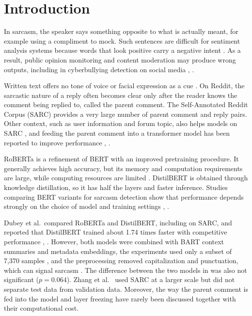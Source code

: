 \documentclass[conference]{IEEEtran}
\begin{document}
\section{Introduction}
In sarcasm, the speaker says something opposite to what is actually meant, for example using a compliment to mock. Such sentences are difficult for sentiment analysis systems because words that look positive carry a negative intent \cite{prakash2025sarcasm}. As a result, public opinion monitoring and content moderation may produce wrong outputs, including in cyberbullying detection on social media \cite{dhumpati2025sarcasm}, \cite{grover2026emoji}.

Written text offers no tone of voice or facial expression as a cue \cite{jimenez2026bert}. On Reddit, the sarcastic nature of a reply often becomes clear only after the reader knows the comment being replied to, called the parent comment. The Self-Annotated Reddit Corpus (SARC) \cite{khodak2018sarc} provides a very large number of parent comment and reply pairs. Other context, such as user information and forum topic, also helps models on SARC \cite{hao2023enhanced}, and feeding the parent comment into a transformer model has been reported to improve performance \cite{ataeii2020transformers}, \cite{dubey2025unpacking}.

RoBERTa \cite{liu2019roberta} is a refinement of BERT with an improved pretraining procedure. It generally achieves high accuracy, but its memory and computation requirements are large, while computing resources are limited \cite{treviso2023efficient}. DistilBERT \cite{sanh2019distilbert} is obtained through knowledge distillation, so it has half the layers and faster inference. Studies comparing BERT variants for sarcasm detection show that performance depends strongly on the choice of model and training settings \cite{jimenez2026bert}, \cite{ullah2026advanced}.

Dubey et al.\ compared RoBERTa and DistilBERT, including on SARC, and reported that DistilBERT trained about 1.74 times faster with competitive performance \cite{dubey2025unpacking}, \cite{dubey2026efficient}. However, both models were combined with BART context summaries and metadata embeddings, the experiments used only a subset of 7,370 samples \cite{dubey2025unpacking}, and the preprocessing removed capitalization and punctuation, which can signal sarcasm \cite{dubey2026efficient}. The difference between the two models in \cite{dubey2026efficient} was also not significant ($p = 0.064$). Zhang et al.\ \cite{zhang2025enhancing} used SARC at a larger scale but did not separate test data from validation data. Moreover, the way the parent comment is fed into the model and layer freezing have rarely been discussed together with their computational cost.
\end{document}
